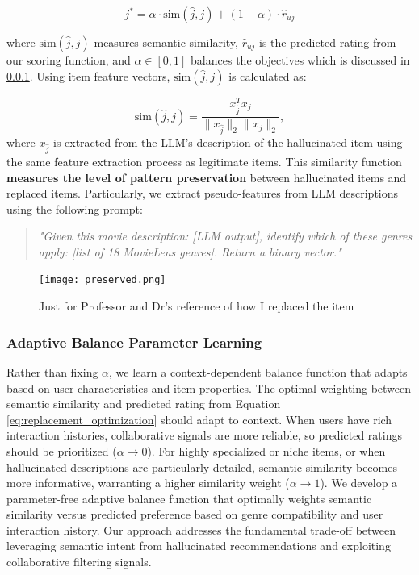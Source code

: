 \documentclass[acmsmall]{acmart}
\begin{document}
\begin{equation}
j^* = \alpha \cdot \text{sim}(\hat{j}, j) + (1-\alpha) \cdot \hat{r}_{uj}
\label{eq:replacement_optimization}
\end{equation}

where $\text{sim}(\hat{j}, j)$ measures semantic similarity, $\hat{r}_{uj}$ is the predicted rating from our scoring function, and $\alpha \in [0,1]$ balances the objectives which is discussed in \ref{adaptive}. Using item feature vectors, $\text{sim}(\hat{j}, j)$ is calculated as: 

\begin{equation}
\text{sim}(\hat{j}, j) = \frac{x_{\hat{j}}^T x_j}{\|x_{\hat{j}}\|_2 \|x_j\|_2},
\label{eq:content_similarity}
\end{equation}
where $x_{\hat{j}}$ is extracted from the LLM's description of the hallucinated item using the same feature extraction process as legitimate items. This similarity function\textbf{ measures the level of pattern preservation} between hallucinated items and replaced items.
Particularly, we extract pseudo-features from LLM descriptions using the following prompt:
\begin{quote}
\textit{"Given this movie description: [LLM output], identify which of these genres apply: [list of 18 MovieLens genres]. Return a binary vector."}
\end{quote}
\begin{figure}
    \centering
    \texttt{[image: preserved.png]}
    \caption{Just for Professor and Dr's reference of how I replaced the item}
    \label{fig:replacement-table}
\end{figure}

\subsubsection{Adaptive Balance Parameter Learning}
\label{adaptive}
Rather than fixing $\alpha$, we learn a context-dependent balance function that adapts based on user characteristics and item properties. The optimal weighting between semantic similarity and predicted rating from Equation \ref{eq:replacement_optimization} should adapt to context. When users have rich interaction histories, collaborative signals are more reliable, so predicted ratings should be prioritized ($\alpha \to 0$). For highly specialized or niche items, or when hallucinated descriptions are particularly detailed, semantic similarity becomes more informative, warranting a higher similarity weight ($\alpha \to 1$).
We develop a parameter-free adaptive balance function that optimally weights semantic similarity versus predicted preference based on genre compatibility and user interaction history. Our approach addresses the fundamental trade-off between leveraging semantic intent from hallucinated recommendations and exploiting collaborative filtering signals.
\end{document}
